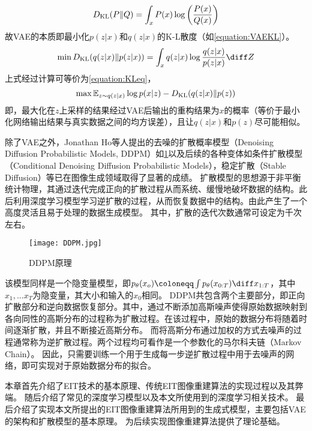 \begin{equation}
  \centering
  \label{equation:KLdivergence}
  D_{\text{KL}}(P \| Q) = \int_{x} P(x) \log \left( \frac{P(x)}{Q(x)} \right)
\end{equation}
故VAE的本质即最小化$p(z|x)$和$q(z|x)$的K-L散度（如\cref{equation:VAEKL}）。
\begin{equation}
  \centering
  \label{equation:VAEKL}
  \min D_{\text{KL}}(q(z|x)\|p(z|x)) = \int_{x}q(z|x)\log \frac{q(z|x)}{p(z|x)}\diff Z
\end{equation}
上式经过计算可等价为\cref{equation:KLeq}，
\begin{equation}
  \centering
  \max  \mathbb{E}_{z\sim q(z|x)} \log p(x|z) - D_{\text{KL}}(q(z|x)\|p(z))
  \label{equation:KLeq}
\end{equation}
即，最大化在$z$上采样的结果经过VAE后输出的重构结果为$x$的概率（等价于最小化网络输出结果与真实数据之间的均方误差），且让$q(z|x)$和$p(z)$尽可能相似。


除了VAE之外，Jonathan Ho等人提出的去噪的扩散概率模型\cite{DDPM}（Denoising Diffusion Probabilistic Models, DDPM）如\cref{figure:DDPM}以及后续的各种变体如条件扩散模型\cite{CondDDPM}（Conditional Denoising Diffusion Probabilistic Models），稳定扩散\cite{StableDiffusion}（Stable Diffusion）等已在图像生成领域取得了显著的成绩。
扩散模型的思想源于非平衡统计物理，其通过迭代完成正向的扩散过程从而系统、缓慢地破坏数据的结构。此后利用深度学习模型学习逆扩散的过程，从而恢复数据中的结构。由此产生了一个高度灵活且易于处理的数据生成模型。
其中，扩散的迭代次数通常可设定为千次左右。
\begin{figure}[h]
  \centering
  \texttt{[image: DDPM.jpg]}
  \caption{DDPM原理}
  \label{figure:DDPM}
  \end{figure}

该模型同样是一个隐变量模型，即$p_\theta(x_o) \coloneqq \int p_\theta(x_{0:T})\diff x_{1:T}$，其中$x_1,...x_T$为隐变量，其大小和输入的$x_0$相同。
DDPM共包含两个主要部分，即正向扩散部分和逆向数据恢复部分。其中，通过不断添加高斯噪声使得原始数据映射到各向同性的高斯分布的过程称为扩散过程。在该过程中，原始的数据分布将随着时间逐渐扩散，并且不断接近高斯分布。
而将高斯分布通过加权的方式去噪声的过程通常称为逆扩散过程。两个过程均可看作是一个参数化的马尔科夫链（Markov Chain）。
因此，只需要训练一个用于生成每一步逆扩散过程中用于去噪声的网络，即可实现对于原始数据分布的拟合。


本章首先介绍了EIT技术的基本原理、传统EIT图像重建算法的实现过程以及其弊端。
随后介绍了常见的深度学习模型以及本文所使用到的深度学习相关技术。
最后介绍了实现本文所提出的EIT图像重建算法所用到的生成式模型，主要包括VAE的架构和扩散模型的基本原理。
为后续实现图像重建算法提供了理论基础。
